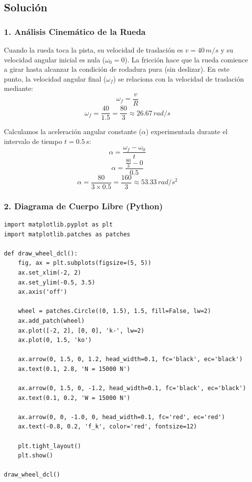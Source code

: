 \documentclass[12pt, a4paper]{article}
\begin{document}
\subsection*{Solución}

\subsubsection*{1. Análisis Cinemático de la Rueda}
Cuando la rueda toca la pista, su velocidad de traslación es $v = 40 \, \si{m/s}$ y su velocidad angular inicial es nula ($\omega_0 = 0$). La fricción hace que la rueda comience a girar hasta alcanzar la condición de rodadura pura (sin deslizar). En este punto, la velocidad angular final ($\omega_f$) se relaciona con la velocidad de traslación mediante:
$$\omega_f = \frac{v}{R}$$
$$\omega_f = \frac{40}{1.5} = \frac{80}{3} \approx 26.67 \, \si{rad/s}$$

Calculamos la aceleración angular constante ($\alpha$) experimentada durante el intervalo de tiempo $t = 0.5 \, \si{s}$:
$$\alpha = \frac{\omega_f - \omega_0}{t}$$
$$\alpha = \frac{\frac{80}{3} - 0}{0.5}$$
$$\alpha = \frac{80}{3 \times 0.5} = \frac{160}{3} \approx 53.33 \, \si{rad/s^2}$$

\subsubsection*{2. Diagrama de Cuerpo Libre (Python)}
\begin{lstlisting}
import matplotlib.pyplot as plt
import matplotlib.patches as patches

def draw_wheel_dcl():
    fig, ax = plt.subplots(figsize=(5, 5))
    ax.set_xlim(-2, 2)
    ax.set_ylim(-0.5, 3.5)
    ax.axis('off')
    
    wheel = patches.Circle((0, 1.5), 1.5, fill=False, lw=2)
    ax.add_patch(wheel)
    ax.plot([-2, 2], [0, 0], 'k-', lw=2)
    ax.plot(0, 1.5, 'ko')
    
    ax.arrow(0, 1.5, 0, 1.2, head_width=0.1, fc='black', ec='black')
    ax.text(0.1, 2.8, 'N = 15000 N')
    
    ax.arrow(0, 1.5, 0, -1.2, head_width=0.1, fc='black', ec='black')
    ax.text(0.1, 0.2, 'W = 15000 N')
    
    ax.arrow(0, 0, -1.0, 0, head_width=0.1, fc='red', ec='red')
    ax.text(-0.8, 0.2, 'f_k', color='red', fontsize=12)
    
    plt.tight_layout()
    plt.show()

draw_wheel_dcl()
\end{lstlisting}
\end{document}
